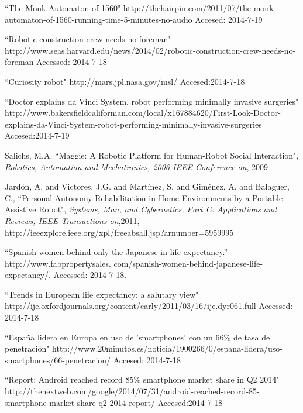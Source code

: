 \begin{thebibliography}{9}

``The Monk Automaton of 1560" http://thehairpin.com/2011/07/the-monk-automaton-of-1560-running-time-5-minutes-no-audio Accesed: 2014-7-19

``Robotic construction crew needs no foreman" http://www.seas.harvard.edu/news/2014/02/robotic-construction-crew-needs-no-foreman Accessed: 2014-7-18

``Curiosity robot" http://mars.jpl.nasa.gov/msl/ Accesed:2014-7-18

``Doctor explains da Vinci System, robot performing minimally invasive surgeries" http://www.bakersfieldcalifornian.com/local/x167884620/First-Look-Doctor-explains-da-Vinci-System-robot-performing-minimally-invasive-surgeries Accesed:2014-7-19

Salichs, M.A. ``Maggie: A Robotic Platform for Human-Robot Social Interaction", \textit{Robotics, Automation and Mechatronics, 2006 IEEE Conference on},  2009 


Jard\'on, A. and Victores, J.G. and Mart\'inez, S. and Gim\'enez, A. and Balaguer, C., ``Personal Autonomy Rehabilitation in Home Environments by a Portable Assistive Robot", \textit{Systems, Man, and Cybernetics, Part C: Applications and Reviews, IEEE Transactions on},2011, http://ieeexplore.ieee.org/xpl/freeabs\textunderscore all.jsp?arnumber=5959995


 “Spanish women behind only the Japanese in life-expectancy.” http://www.fabpropertysales.
com/spanish-women-behind-japanese-life-expectancy/. Accessed: 2014-7-18.

``Trends in European life expectancy: a salutary view" http://ije.oxfordjournals.org/content/early/2011/03/16/ije.dyr061.full Accessed: 2014-7-18

``España lidera en Europa en uso de 'smartphones' con un 66\% de tasa de penetración" http://www.20minutos.es/noticia/1900266/0/espana-lidera/uso-smartphones/66-penetracion/ Accesed: 2014-7-18

``Report: Android reached record 85\% smartphone market share in Q2 2014"
http://thenextweb.com/google/2014/07/31/android-reached-record-85-smartphone-market-share-q2-2014-report/ Accesed:2014-7-18









\end{thebibliography}
